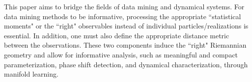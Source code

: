 \documentclass[prl, reprint, final, showkeys]{revtex4-1}
\begin{document}



This paper aims to bridge the fields of data mining and dynamical systems. For data mining methods to be informative, processing the appropriate ``statistical moments" or the ``right" observables instead of individual particles/realizations is essential. In addition, one must also define the appropriate distance metric between the observations.
These two components induce the ``right" Riemannian geometry and allow for informative analysis, such as meaningful and compact parameterization, phase shift detection, and dynamical characterization, through manifold learning.
\end{document}
